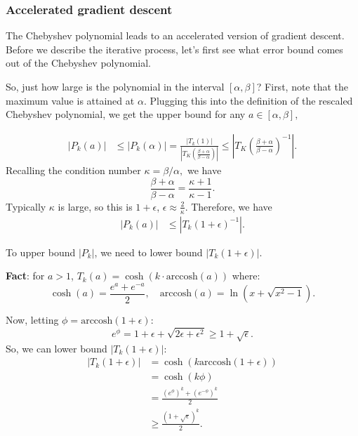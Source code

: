 \subsubsection{Accelerated gradient descent}

The Chebyshev polynomial leads to an accelerated version of gradient descent. Before we describe the iterative process, let's first see what error bound comes out of the Chebyshev polynomial.

So, just how large is the polynomial in the interval $[\alpha, \beta]$? First,
note that the maximum value is attained at $\alpha$. Plugging this into the
definition of the rescaled Chebyshev polynomial, we get the upper bound for any
$a\in[\alpha, \beta],$

\begin{align*}
|P_k(a)| &\leq |P_k(\alpha)| 
= \frac{|T_k(1)|}{|T_K\left(\frac{\beta + \alpha}{\beta - \alpha}\right)|} 
\le \left|T_K\left(\frac{\beta + \alpha}{\beta - \alpha}\right)^{-1}\right|.
\end{align*}
Recalling the condition number $\kappa=\beta/\alpha,$ we have
\begin{equation*}
\frac{\beta + \alpha}{\beta - \alpha} = \frac{\kappa + 1}{\kappa - 1}.
\end{equation*}
Typically $\kappa$ is large, so this is $1 + \epsilon$, $\epsilon \approx \frac{2}{\kappa}$. Therefore, we have
\begin{eqnarray*}
|P_k(a)| &\leq {|T_k(1 + \epsilon)^{-1}|}.
\end{eqnarray*}

To upper bound $|P_k|$, we need to lower bound $|T_k(1 + \epsilon)|$.

\textbf{Fact}: for $a > 1$, $T_k(a) = \cosh\left(k \cdot \mathrm{arccosh} (a)\right)$ where:
\begin{equation*}
\cosh(a) = \frac{e^a + e^{-a}}{2},\quad \mathrm{arccosh}(a) = \ln\left(x + \sqrt{x^2 - 1}\right).
\end{equation*}

Now, letting $\phi = \mathrm{arccosh}(1 + \epsilon)$:
\begin{equation*}
e^{\phi} = 1 + \epsilon + \sqrt{2\epsilon + \epsilon^2} \geq 1 + \sqrt{\epsilon}.
\end{equation*}
So, we can lower bound $|T_k(1 + \epsilon)|$:
\begin{align*}
|T_k(1 + \epsilon)| &= \cosh\left(k \mathrm{arccosh}(1 + \epsilon)\right) \\
&= \cosh(k\phi) \\
&= \frac{(e^\phi)^k + (e^{-\phi})^k}{2} \\
&\geq \frac{(1 + \sqrt{\epsilon})^k}{2}.
\end{align*}

